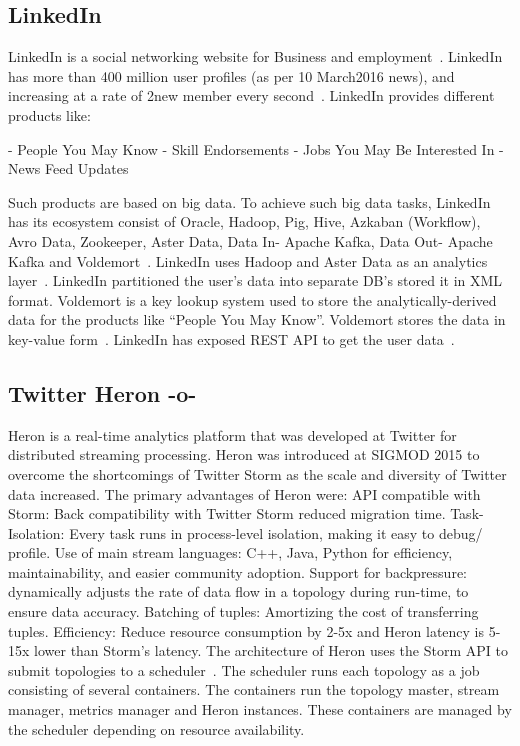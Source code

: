      \pv

\subsection{LinkedIn}
     
LinkedIn is a social networking website for Business and
employment~\cite{www-linkedinwiki}. LinkedIn has more than 400 million
user profiles (as per 10 March2016 news), and increasing at a rate of
2new member every second~\cite{www-linkedinbigdata}.  LinkedIn
provides different products like:

     - People You May Know
     - Skill Endorsements
     - Jobs You May Be Interested In
     - News Feed Updates

     Such products are based on big data. To achieve such big data
     tasks, LinkedIn has its ecosystem consist of Oracle, Hadoop, Pig,
     Hive, Azkaban (Workflow), Avro Data, Zookeeper, Aster Data, Data
     In- Apache Kafka, Data Out- Apache Kafka and
     Voldemort~\cite{www-linkedinbigdata}. LinkedIn uses Hadoop and
     Aster Data as an analytics
     layer~\cite{www-linkedinquora}. LinkedIn partitioned the user's
     data into separate DB's stored it in XML format. Voldemort is a
     key lookup system used to store the analytically-derived data for
     the products like ``People You May Know''. Voldemort stores the
     data in key-value form~\cite{www-linkedinquora}. LinkedIn has
     exposed REST API to get the user
     data~\cite{www-linkedindevelopers}.

\subsection{Twitter Heron -o-}

Heron is a real-time analytics platform that was developed at Twitter
for distributed streaming processing. Heron was introduced at SIGMOD
2015 to overcome the shortcomings of Twitter Storm as the scale and
diversity of Twitter data increased.  The primary advantages of Heron
were: API compatible with Storm: Back compatibility with Twitter Storm
reduced migration time\cite{www-TwitterHeronOpen}.  Task-Isolation:
Every task runs in process-level isolation, making it easy to debug/
profile. Use of main stream languages: C++, Java, Python for
efficiency, maintainability, and easier community adoption. Support
for backpressure: dynamically adjusts the rate of data flow in a
topology during run-time, to ensure data accuracy. Batching of tuples:
Amortizing the cost of transferring tuples. Efficiency: Reduce
resource consumption by 2-5x and Heron latency is 5-15x lower than
Storm's latency. The architecture of Heron uses the Storm API to
submit topologies to a scheduler~\cite{www-TwitterHeron}.  The
scheduler runs each topology as a job consisting of several
containers. The containers run the topology master, stream manager,
metrics manager and Heron instances. These containers are managed by
the scheduler depending on resource availability.

